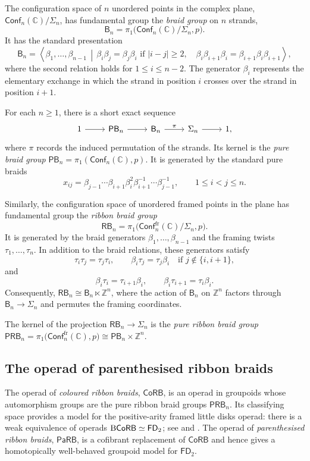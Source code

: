 \documentclass{amsart}
\newcommand{\CoRB}{\mathsf{CoRB}}
\newcommand{\PaRB}{\mathsf{PaRB}}
\newcommand{\twist}{\tau}
\newcommand{\cs}{\textnormal{B}}
\newcommand{\Br}{\mathsf{B}} %
\newcommand{\PB}{\mathsf{PB}} %
\newcommand{\RB}{\mathsf{RB}} %
\newcommand{\PRB}{\mathsf{PRB}} %
\newcommand{\Conf}{\mathsf{Conf}}%
\theoremstyle{definition}
\numberwithin{equation}{section}
\begin{document}
The configuration space of $n$ unordered points in the complex plane,
$\Conf_n(\mathbb C)/\Sigma_n$, has fundamental group the
\emph{braid group} on $n$ strands,
\[
\Br_n=\pi_1\bigl(\Conf_n(\mathbb C)/\Sigma_n,p\bigr).
\]
It has the standard presentation
\[
\Br_n=
\left\langle
\beta_1,\ldots,\beta_{n-1}
\,\middle|\,
\beta_i\beta_j=\beta_j\beta_i\text{ if }|i-j|\geq2,\quad
\beta_i\beta_{i+1}\beta_i
=\beta_{i+1}\beta_i\beta_{i+1}
\right\rangle,
\]
where the second relation holds for $1\leq i\leq n-2$. The generator
$\beta_i$ represents the elementary exchange in which the strand in
position $i$ crosses over the strand in position $i+1$.

For each $n\geq1$, there is a short exact sequence
\[
\begin{tikzcd}
1 \arrow[r]
& \PB_n \arrow[r]
& \Br_n \arrow[r,"\pi"]
& \Sigma_n \arrow[r]
& 1,
\end{tikzcd}
\]
where $\pi$ records the induced permutation of the strands. Its kernel
is the \emph{pure braid group}
$\PB_n=\pi_1(\Conf_n(\mathbb C),p)$. It is generated by the standard
pure braids
\[
x_{ij}
=
\beta_{j-1}\cdots\beta_{i+1}\beta_i^2
\beta_{i+1}^{-1}\cdots\beta_{j-1}^{-1},
\qquad 1\leq i<j\leq n.
\]

Similarly, the configuration space of unordered framed points in the
plane has fundamental group the \emph{ribbon braid group}
\[
\RB_n
=
\pi_1\bigl(
\Conf_n^{\mathrm{fr}}(\mathbb C)/\Sigma_n,p
\bigr).
\]
It is generated by the braid generators
$\beta_1,\ldots,\beta_{n-1}$ and the framing twists
$\twist_1,\ldots,\twist_n$. In addition to the braid relations, these
generators satisfy
\[
\twist_i\twist_j=\twist_j\twist_i,\qquad \beta_i\twist_j=\twist_j\beta_i \quad\text{if }j\notin\{i,i+1\},
\]
and
\[
\beta_i\twist_i=\twist_{i+1}\beta_i,\qquad
\beta_i\twist_{i+1}=\twist_i\beta_i.
\]
Consequently, $\RB_n\cong\Br_n\ltimes\mathbb Z^n$, where the action of $\Br_n$ on $\mathbb Z^n$ factors through $\Br_n\to\Sigma_n$ and permutes the framing coordinates.

The kernel of the projection $\RB_n\to\Sigma_n$ is the \emph{pure ribbon braid group} $\PRB_n = \pi_1\bigl(\Conf_n^{\mathrm{fr}}(\mathbb C),p\bigr) \cong \PB_n\times\mathbb Z^n.$
 
\subsection{The operad of parenthesised ribbon braids}
\label{subsec:operad PaRB}

The operad of \emph{coloured ribbon braids}, $\CoRB$, is an operad in
groupoids whose automorphism groups are the pure ribbon braid groups
$\PRB_n$. Its classifying space provides a model for the
positive-arity framed little disks operad: there is a weak equivalence
of operads $\cs\CoRB\simeq\mathsf{FD}_2$; see
\cite[Proposition~6.8]{Boavida-Horel-Robertson} and
\cite[Chapter~1]{Wahl_Thesis}. The operad of
\emph{parenthesised ribbon braids}, $\PaRB$, is a cofibrant replacement
of $\CoRB$ and hence gives a homotopically well-behaved groupoid model
for $\mathsf{FD}_2$.
\end{document}
